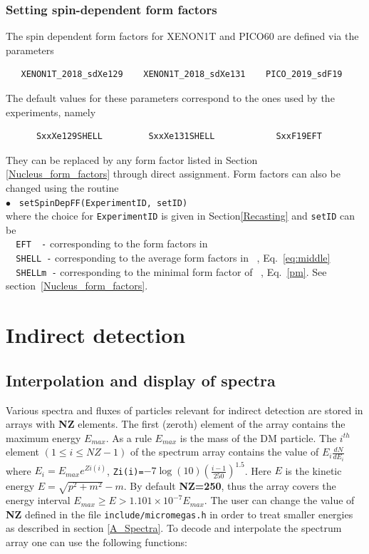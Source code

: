 \documentclass[12pt,a4paper]{article}
\begin{document}
\subsubsection{Setting spin-dependent form factors}  
\label{SDmin}

The spin dependent form factors for XENON1T and PICO60  are defined via the parameters 
\begin{verbatim}
   XENON1T_2018_sdXe129    XENON1T_2018_sdXe131    PICO_2019_sdF19
\end{verbatim}
The default values for these parameters correspond to the ones used by the experiments, namely   
\begin{verbatim}
      SxxXe129SHELL         SxxXe131SHELL            SxxF19EFT  
\end{verbatim}
They can be replaced by any form factor listed  in Section \ref{Nucleus_form_factors} through direct
assignment. Form factors can also be changed using the routine  \\
\noindent
$\bullet$ \verb| setSpinDepFF(ExperimentID, setID)|\\
where the choice for \verb|ExperimentID| is given in Section\ref{Recasting} 
and \verb|setID| can be \\
 \verb|  EFT  -|  corresponding to  the form factors in ~\cite{Fitzpatrick:2012ix}\\
  \verb|  SHELL -|  corresponding to  the average form factors in ~\cite{Klos:2013rwa}, Eq.~\ref{eq:middle}\\
  \verb|  SHELLm -|  corresponding to the  minimal form factor of  ~\cite{Klos:2013rwa}, Eq.~\ref{pm}.  See section~\ref{Nucleus_form_factors}.

  
\section{Indirect detection}

\subsection{Interpolation and display of spectra}
Various spectra and fluxes  of particles  relevant for indirect detection are stored in
arrays with {\bf NZ} elements. 
The first (zeroth) element of the array contains the maximum energy $E_{max}$. As a rule   $E_{max}$ is the mass of the DM particle.    
The $i^{th}$ element  $(1\le i \leq NZ-1)$  of the spectrum array contains
the value of $E_i \frac{ dN}{dE_i} $ where  $E_i=E_{max} e^{Zi(i)}$,
\verb|Zi(i)=|$ -7 \log(10) \left(\frac{i-1}{250}\right)^{1.5}$.
Here $E$ is the kinetic energy $E=\sqrt{p^2+m^2}-m$.  By default  {\bf NZ=250}, thus the array  covers the  energy interval  
$E_{max} \ge E > 1.101 \times10^{-7}E_{max}$. The user can change the value of {\bf NZ} defined in the file {\tt include/micromegas.h} in order to  treat  smaller energies as described in
section \ref{A_Spectra}.
To decode and interpolate the spectrum array
one can use the following functions:\\
\end{document}
